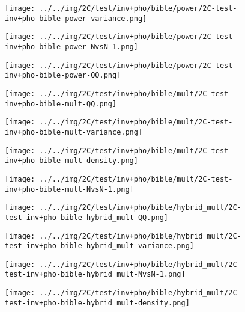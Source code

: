 \begin{figure}[H]
\centering	\texttt{[image: ../../img/2C/test/inv+pho/bible/power/2C-test-inv+pho-bible-power-variance.png]}
\end{figure}
\begin{figure}[H]
\centering	\texttt{[image: ../../img/2C/test/inv+pho/bible/power/2C-test-inv+pho-bible-power-NvsN-1.png]}
\end{figure}
\begin{figure}[H]
\centering	\texttt{[image: ../../img/2C/test/inv+pho/bible/power/2C-test-inv+pho-bible-power-QQ.png]}
\end{figure}
\begin{figure}[H]
\centering	\texttt{[image: ../../img/2C/test/inv+pho/bible/mult/2C-test-inv+pho-bible-mult-QQ.png]}
\end{figure}
\begin{figure}[H]
\centering	\texttt{[image: ../../img/2C/test/inv+pho/bible/mult/2C-test-inv+pho-bible-mult-variance.png]}
\end{figure}
\begin{figure}[H]
\centering	\texttt{[image: ../../img/2C/test/inv+pho/bible/mult/2C-test-inv+pho-bible-mult-density.png]}
\end{figure}
\begin{figure}[H]
\centering	\texttt{[image: ../../img/2C/test/inv+pho/bible/mult/2C-test-inv+pho-bible-mult-NvsN-1.png]}
\end{figure}
\begin{figure}[H]
\centering	\texttt{[image: ../../img/2C/test/inv+pho/bible/hybrid\_mult/2C-test-inv+pho-bible-hybrid\_mult-QQ.png]}
\end{figure}
\begin{figure}[H]
\centering	\texttt{[image: ../../img/2C/test/inv+pho/bible/hybrid\_mult/2C-test-inv+pho-bible-hybrid\_mult-variance.png]}
\end{figure}
\begin{figure}[H]
\centering	\texttt{[image: ../../img/2C/test/inv+pho/bible/hybrid\_mult/2C-test-inv+pho-bible-hybrid\_mult-NvsN-1.png]}
\end{figure}
\begin{figure}[H]
\centering	\texttt{[image: ../../img/2C/test/inv+pho/bible/hybrid\_mult/2C-test-inv+pho-bible-hybrid\_mult-density.png]}
\end{figure}
